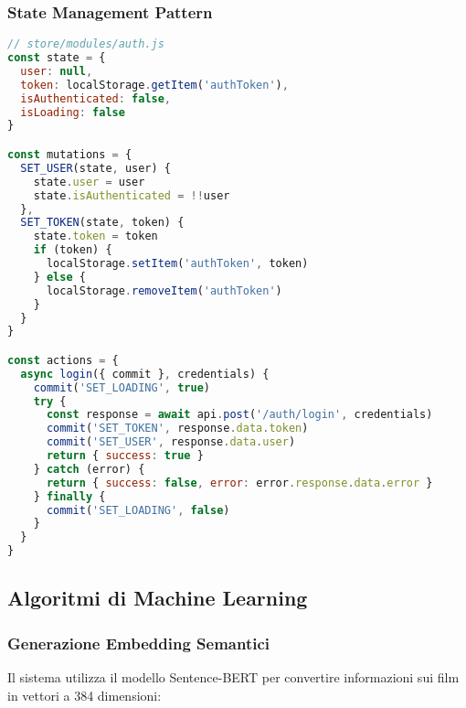 \documentclass[11pt,a4paper]{article}
\begin{document}
\subsubsection{State Management Pattern}
\begin{lstlisting}[language=JavaScript, caption=Vuex Store Structure]
// store/modules/auth.js
const state = {
  user: null,
  token: localStorage.getItem('authToken'),
  isAuthenticated: false,
  isLoading: false
}

const mutations = {
  SET_USER(state, user) {
    state.user = user
    state.isAuthenticated = !!user
  },
  SET_TOKEN(state, token) {
    state.token = token
    if (token) {
      localStorage.setItem('authToken', token)
    } else {
      localStorage.removeItem('authToken')
    }
  }
}

const actions = {
  async login({ commit }, credentials) {
    commit('SET_LOADING', true)
    try {
      const response = await api.post('/auth/login', credentials)
      commit('SET_TOKEN', response.data.token)
      commit('SET_USER', response.data.user)
      return { success: true }
    } catch (error) {
      return { success: false, error: error.response.data.error }
    } finally {
      commit('SET_LOADING', false)
    }
  }
}
\end{lstlisting}

\subsection{Algoritmi di Machine Learning}

\subsubsection{Generazione Embedding Semantici}
Il sistema utilizza il modello Sentence-BERT per convertire informazioni sui film in vettori a 384 dimensioni:
\end{document}
